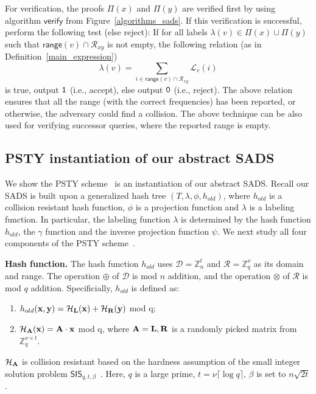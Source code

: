 For verification, the proofs $\Pi(x)$ and $\Pi(y)$ are verified first by using algorithm $\mathsf{verify}$ from Figure~\ref{algorithms_sads}. If this verification is successful, perform the following test (else reject): If for all labels $\lambda(v)\in \Pi(x) \cup \Pi(y)$ such that $\mathsf{range}(v)\cap\mathcal{R}_{xy}$ is not empty, the following relation (as in Definition~\ref{main_expression}) 
\begin{equation}\label{eq:check_efficiency}
\lambda(v) =\sum_{i\in \mathsf{range}(v)\cap\mathcal{R}_{xy}} \mathcal{L}_v(i)
\end{equation}
is true, output $\tt{1}$ (i.e., accept), else output $\tt{0}$ (i.e., reject).
The above relation ensures that all the range (with the correct frequencies) has been reported, or otherwise, the adversary could find a collision. The above technique can be also used for verifying successor queries, where the reported range is empty.

\subsection{PSTY instantiation of our abstract SADS}\label{instantiation}
We show the PSTY scheme~\cite{DBLP:conf/eurocrypt/PapamanthouSTY13} is an instantiation of our abstract SADS. Recall our SADS is built upon a generalized hash tree $(T,\lambda,\phi,h_{old})$, where $h_{old}$ is a collision resistant hash function, $\phi$ is a projection function and $\lambda$ is a labeling function. In particular, the labeling function $\lambda$ is determined by the hash function $h_{old}$, the $\gamma$ function and the inverse projection function $\psi$. We next study all four components of the PSTY scheme~\cite{DBLP:conf/eurocrypt/PapamanthouSTY13}.

{\bf Hash function.} 
The hash function $h_{old}$ uses ${\mathcal{D}}= \mathbb{Z}_n^{t}$ and ${\mathcal{R}} = \mathbb{Z}_q^{\nu}$ as its domain and range. The operation $\oplus$ of ${\mathcal{D}}$ is mod $n$ addition, and the operation $\otimes$ of ${\mathcal{R}}$ is mod $q$ addition. 
Specificially, $h_{old}$ is defined as: 
\begin{enumerate}
\item $h_{old} ({\bf x, y})= {\bf {\cal H}_{L}(x)}  + {\bf {\cal H}_{R}(y)}$ mod q;
\item ${\bf {\cal H}_{A}(x)} = {\bf A \cdot x}$ mod q, where $\bf A= L, R$ is a randomly picked matrix from $\mathbb{Z}_q^{\nu \times t}$.
\end{enumerate}
${\bf {\cal H}_{A}}$ is collision resistant based on the hardness assumption of the small integer solution problem $\mathsf{SIS}_{q, t,\beta}$~\cite{DBLP:journals/siamcomp/MicciancioR07}. Here, $q$ is a large prime, $t=\nu \lceil \log q \rceil$, $\beta$ is set to $n\sqrt{2t}$.

